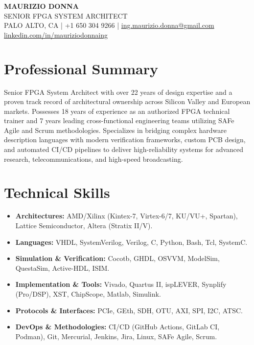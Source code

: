 \documentclass[10pt, letterpaper]{article}
\begin{document}
\begin{center}
    {\LARGE \textbf{MAURIZIO DONNA}}\\[4pt]
    {\large SENIOR FPGA SYSTEM ARCHITECT}\\[4pt]
    PALO ALTO, CA | +1 650 304 9266 | \href{mailto:ing.maurizio.donna@gmail.com}{ing.maurizio.donna@gmail.com}\\
    \href{https://linkedin.com/in/mauriziodonnaing}{linkedin.com/in/mauriziodonnaing}
\end{center}

\section*{Professional Summary}
Senior FPGA System Architect with over 22 years of design expertise and a proven track record of architectural ownership across Silicon Valley and European markets. Possesses 18 years of experience as an authorized FPGA technical trainer and 7 years leading cross-functional engineering teams utilizing SAFe Agile and Scrum methodologies. Specializes in bridging complex hardware description languages with modern verification frameworks, custom PCB design, and automated CI/CD pipelines to deliver high-reliability systems for advanced research, telecommunications, and high-speed broadcasting.

\section*{Technical Skills}
\begin{itemize}[leftmargin=*, nosep]
    \item \textbf{Architectures:} AMD/Xilinx (Kintex-7, Virtex-6/7, KU/VU+, Spartan), Lattice Semiconductor, Altera (Stratix II/V).
    \item \textbf{Languages:} VHDL, SystemVerilog, Verilog, C, Python, Bash, Tcl, SystemC.
    \item \textbf{Simulation \& Verification:} Cocotb, GHDL, OSVVM, ModelSim, QuestaSim, Active-HDL, ISIM.
    \item \textbf{Implementation \& Tools:} Vivado, Quartus II, ispLEVER, Synplify (Pro/DSP), XST, ChipScope, Matlab, Simulink.
    \item \textbf{Protocols \& Interfaces:} PCIe, GEth, SDH, OTU, AXI, SPI, I2C, ATSC.
    \item \textbf{DevOps \& Methodologies:} CI/CD (GitHub Actions, GitLab CI, Podman), Git, Mercurial, Jenkins, Jira, Linux, SAFe Agile, Scrum.
\end{itemize}
\end{document}

